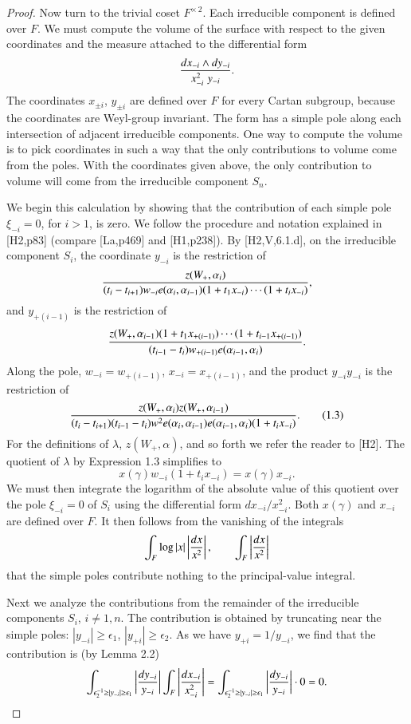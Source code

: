 \documentclass{amsart}
\begin{document}
\begin{proof}
Now turn to the trivial coset $F^{\times\,2}$.  Each
irreducible component is defined over $F$.
We must compute the volume of the surface with respect to
the given coordinates and the measure attached to the differential form
$${d x_{-i} \wedge dy_{-i}\over x_{-i}^2 \,\,y_{-i}}.$$
The coordinates $x_{\pm i}$, $y_{\pm i}$
are defined over $F$
for every Cartan subgroup, because the 
coordinates are Weyl-group invariant.
The form has a simple pole along each intersection of adjacent
irreducible components. 
One way to compute
the volume is to pick coordinates in such a way that the
only contributions to volume come from the poles.  With
the coordinates given above, the only contribution to
volume will come from the irreducible component $S_n$.

We begin this calculation by showing that the contribution
of each simple pole $\xi_{-i}=0$, for $i>1$,  is zero.  We follow
the procedure and notation explained in [H2,p83] (compare
[La,p469] and [H1,p238]).  
By [H2,V,6.1.d], on the irreducible component $S_i$,
the coordinate
$y_{-i}$ is the restriction of
$${z(W_+,\alpha_i)\over (t_i-t_{i+1}) w_{-i} e(\alpha_i,\alpha_{i-1})(1+t_1 x_{-i})
\cdots (1+t_i x_{-i} )},$$
and $y_{+(i-1)}$ is the restriction of
$${z(W_+,\alpha_{i-1}) (1+t_1 x_{+(i-1)})\cdots (1+t_{i-1} x_{+(i-1)})\over
(t_{i-1}-t_i) w_{+(i-1)} e(\alpha_{i-1},\alpha_i)}.$$
Along the pole, $w_{-i}=w_{+(i-1)}$, $x_{-i} = x_{+(i-1)}$, 
and the product $y_{-i}y_{-i}$ is the restriction
of 
\begin{equation}{z(W_+,\alpha_i)z(W_+,\alpha_{i-1})\over
(t_i-t_{i+1})(t_{i-1}-t_i) w^2 e(\alpha_i,\alpha_{i-1})e(\alpha_{i-1},\alpha_i)
(1+t_i x_{-i})}.\tag{1.3}
\end{equation}
For the definitions of $\lambda$, $z(W_+,\alpha)$, and so forth
we refer the reader to [H2].
The quotient of $\lambda$ by Expression 1.3 simplifies to
$$ x(\gamma)w_{-i}(1+t_i x_{-i} ) = x(\gamma) x_{-i}.$$
We must then integrate the logarithm of the absolute value 
of this quotient 
over the pole $\xi_{-i}=0$ of $S_i$ using the differential
form $d x_{-i}/x_{-i}^2$. Both $x(\gamma)$ and
$x_{-i}$ are defined over $F$.  It then follows from the
vanishing of the integrals
$$\int_F \log|x| \left | {dx\over x^2}\right|,\qquad
  \int_F \left| {dx\over x^2}\right |$$
that the simple poles contribute nothing to the principal-value
integral.

Next we analyze the contributions from the remainder of the
irreducible components $S_i$, $i\ne 1,n$.  The contribution
is obtained by truncating near the simple poles:
$|y_{-i}|\ge \epsilon_1$, $|y_{+i}|\ge \epsilon_2$.
As we have $y_{+i}=1/y_{-i}$, we find that the contribution
is (by Lemma 2.2)
$$\int_{\epsilon^{-1}_2 \ge |y_{-i}|\ge \epsilon_1}
\left| {dy_{-i}\over y_{-i}}\right |
\int_F \left| { dx_{-i}\over x^2_{-i}}\right| =
\int_{\epsilon^{-1}_2 \ge |y_{-i}|\ge \epsilon_1}
\left| {dy_{-i}\over y_{-i}}\right | \cdot 0 = 0.$$


\end{proof}
\end{document}
